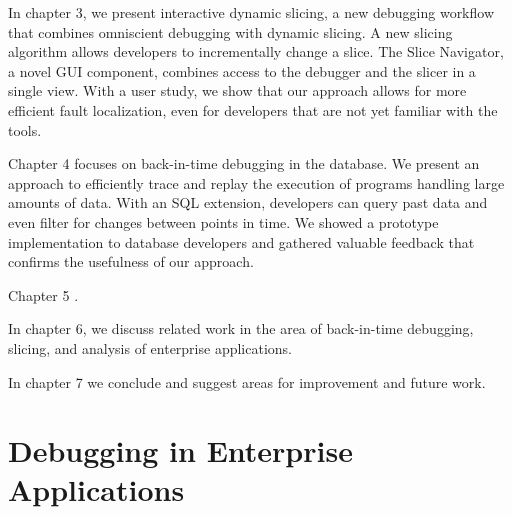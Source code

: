 In chapter 3, we present interactive dynamic slicing, a new debugging workflow that combines omniscient debugging with dynamic slicing.
A new slicing algorithm allows developers to incrementally change a slice. 
The Slice Navigator, a novel GUI component, combines access to the debugger and the slicer in a single view.
With a user study, we show that our approach allows for more efficient fault localization, even for developers that are not yet familiar with the tools.

Chapter 4 focuses on back-in-time debugging in the database.
We present an approach to efficiently trace and replay the execution of programs handling large amounts of data.
With an SQL extension, developers can query past data and even filter for changes between points in time.
We showed a prototype implementation to database developers and gathered valuable feedback that confirms the usefulness of our approach.

Chapter 5 .

In chapter 6, we discuss related work in the area of back-in-time debugging, slicing, and analysis of enterprise applications.

In chapter 7 we conclude and suggest areas for improvement and future work.


%
%



\chapter{Debugging in Enterprise Applications}

